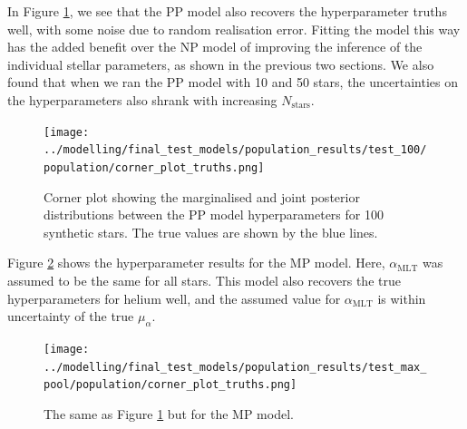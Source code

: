 \documentclass[a4paper,fleqn,usenatbib]{mnras}
\newcommand{\mlt}{\ensuremath{{\alpha_\mathrm{MLT}}}}
\begin{document}
In Figure \ref{fig:test-corners-pp}, we see that the PP model also recovers the hyperparameter truths well, with some noise due to random realisation error. Fitting the model this way has the added benefit over the NP model of improving the inference of the individual stellar parameters, as shown in the previous two sections. We also found that when we ran the PP model with 10 and 50 stars, the uncertainties on the hyperparameters also shrank with increasing $N_\mathrm{stars}$.

\begin{figure}
    \centering
    \texttt{[image: ../modelling/final\_test\_models/population\_results/test\_100/population/corner\_plot\_truths.png]}
    \caption{Corner plot showing the marginalised and joint posterior distributions between the PP model hyperparameters for 100 synthetic stars. The true values are shown by the blue lines.}  
    \label{fig:test-corners-pp}   
\end{figure}

Figure \ref{fig:test-corners-mp} shows the hyperparameter results for the MP model. Here, $\mlt$ was assumed to be the same for all stars. This model also recovers the true hyperparameters for helium well, and the assumed value for $\mlt$ is within uncertainty of the true $\mu_\alpha$.

\begin{figure}
    \centering
    \texttt{[image: ../modelling/final\_test\_models/population\_results/test\_max\_pool/population/corner\_plot\_truths.png]}
    \caption{The same as Figure \ref{fig:test-corners-pp} but for the MP model.}
    \label{fig:test-corners-mp} 
\end{figure}

\end{document}
